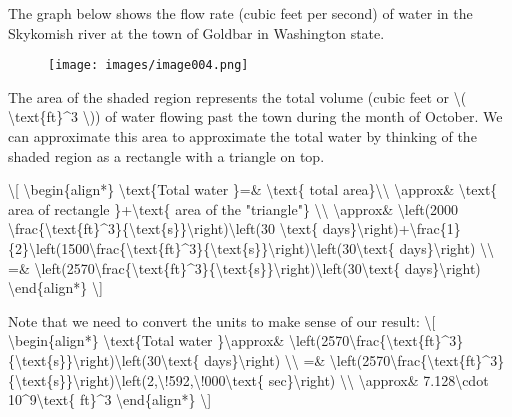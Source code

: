 The graph below shows the flow rate (cubic feet per second) of water in
the Skykomish river at the town of Goldbar in Washington state.

\begin{figure}
\centering
\texttt{[image: images/image004.png]}
\caption{}
\end{figure}

The area of the shaded region represents the total volume (cubic feet or
\textbackslash{}( \textbackslash{}text\{ft\}\^{}3 \textbackslash{})) of
water flowing past the town during the month of October. We can
approximate this area to approximate the total water by thinking of the
shaded region as a rectangle with a triangle on top.

\textbackslash{}{[} \textbackslash{}begin\{align*\}
\textbackslash{}text\{Total water \}=\& \textbackslash{}text\{ total
area\}\textbackslash{}\textbackslash{} \textbackslash{}approx\&
\textbackslash{}text\{ area of rectangle \}+\textbackslash{}text\{ area
of the "triangle"\} \textbackslash{}\textbackslash{}
\textbackslash{}approx\& \textbackslash{}left(2000
\textbackslash{}frac\{\textbackslash{}text\{ft\}\^{}3\}\{\textbackslash{}text\{s\}\}\textbackslash{}right)\textbackslash{}left(30
\textbackslash{}text\{
days\}\textbackslash{}right)+\textbackslash{}frac\{1\}\{2\}\textbackslash{}left(1500\textbackslash{}frac\{\textbackslash{}text\{ft\}\^{}3\}\{\textbackslash{}text\{s\}\}\textbackslash{}right)\textbackslash{}left(30\textbackslash{}text\{
days\}\textbackslash{}right) \textbackslash{}\textbackslash{} =\&
\textbackslash{}left(2570\textbackslash{}frac\{\textbackslash{}text\{ft\}\^{}3\}\{\textbackslash{}text\{s\}\}\textbackslash{}right)\textbackslash{}left(30\textbackslash{}text\{
days\}\textbackslash{}right) \textbackslash{}end\{align*\}
\textbackslash{}{]}

Note that we need to convert the units to make sense of our result:
\textbackslash{}{[} \textbackslash{}begin\{align*\}
\textbackslash{}text\{Total water \}\textbackslash{}approx\&
\textbackslash{}left(2570\textbackslash{}frac\{\textbackslash{}text\{ft\}\^{}3\}\{\textbackslash{}text\{s\}\}\textbackslash{}right)\textbackslash{}left(30\textbackslash{}text\{
days\}\textbackslash{}right) \textbackslash{}\textbackslash{} =\&
\textbackslash{}left(2570\textbackslash{}frac\{\textbackslash{}text\{ft\}\^{}3\}\{\textbackslash{}text\{s\}\}\textbackslash{}right)\textbackslash{}left(2,\textbackslash{}!592,\textbackslash{}!000\textbackslash{}text\{
sec\}\textbackslash{}right) \textbackslash{}\textbackslash{}
\textbackslash{}approx\& 7.128\textbackslash{}cdot
10\^{}9\textbackslash{}text\{ ft\}\^{}3 \textbackslash{}end\{align*\}
\textbackslash{}{]}

